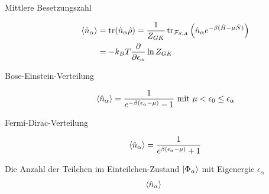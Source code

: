 \begin{description}
\begin{itemize}
    \end{itemize}
  \item[Mittlere Besetzungszahl]
    \begin{align*}
      \Braket{\hat{n}_\alpha} & = \operatorname{tr}(\hat{n}_\alpha \hat{\rho}) = 
      \frac{1}{Z_{GK}} \operatorname{tr}_{\mathcal{F}_{S,A}} \left( \hat{n}_\alpha
      e ^{-\beta (\hat{H} - \mu \hat{N})}\right) \\
      & = -k_B T \frac{\partial  }{\partial \epsilon_\alpha} \ln{Z_{GK}}
    \end{align*}
  \item[Bose-Einstein-Verteilung]
    \begin{align*}
      \Braket{\hat{n}_\alpha} = \frac{1}{e^{-\beta(\epsilon_\alpha - \mu)} - 1}
      \text{ mit } \mu < \epsilon_0 \le \epsilon_\alpha
    \end{align*}
  \item[Fermi-Dirac-Verteilung]
    \begin{align*}
      \Braket{\hat{n}_\alpha} = \frac{1}{e^{\beta(\epsilon_\alpha - \mu)} + 1}
    \end{align*}
\end{description}
Die Anzahl der Teilchen im Einteilchen-Zustand $\Ket{\Phi_\alpha}$
mit Eigenergie $\epsilon_\alpha$
%
\begin{align*}
  \Braket{\hat{n}_\alpha} 
\end{align*}
%


